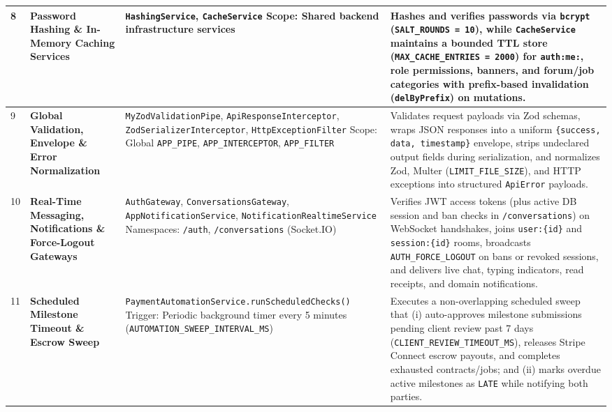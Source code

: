 \begin{longtable}{|C{0.7cm}|L{3.2cm}|S{5.4cm}|p{5.8cm}|}
8 &
\textbf{Password Hashing \& In-Memory Caching Services} &
\texttt{HashingService}, \texttt{CacheService} \newline
Scope: Shared backend infrastructure services &
Hashes and verifies passwords via \texttt{bcrypt} (\texttt{SALT\_ROUNDS = 10}), while \texttt{CacheService} maintains a bounded TTL store (\texttt{MAX\_CACHE\_\allowbreak{}ENTRIES = 2000}) for \texttt{auth:me:}, role permissions, banners, and forum/job categories with prefix-based invalidation (\texttt{delByPrefix}) on mutations.
\\ \hline

9 &
\textbf{Global Validation, Envelope \& Error Normalization} &
\texttt{MyZodValidationPipe}, \texttt{ApiResponseInterceptor}, \texttt{ZodSerializerInterceptor}, \texttt{HttpExceptionFilter} \newline
Scope: Global \texttt{APP\_PIPE}, \texttt{APP\_INTERCEPTOR}, \texttt{APP\_FILTER} &
Validates request payloads via Zod schemas, wraps JSON responses into a uniform \texttt{\{success, data, timestamp\}} envelope, strips undeclared output fields during serialization, and normalizes Zod, Multer (\texttt{LIMIT\_\allowbreak{}FILE\_\allowbreak{}SIZE}), and HTTP exceptions into structured \texttt{ApiError} payloads.
\\ \hline

10 &
\textbf{Real-Time Messaging, Notifications \& Force-Logout Gateways} &
\texttt{AuthGateway}, \texttt{ConversationsGateway}, \texttt{AppNotificationService}, \texttt{NotificationRealtimeService} \newline
Namespaces: \texttt{/auth}, \texttt{/conversations} (Socket.IO) &
Verifies JWT access tokens (plus active DB session and ban checks in \texttt{/conversations}) on WebSocket handshakes, joins \texttt{user:\{id\}} and \texttt{session:\{id\}} rooms, broadcasts \texttt{AUTH\_\allowbreak{}FORCE\_\allowbreak{}LOGOUT} on bans or revoked sessions, and delivers live chat, typing indicators, read receipts, and domain notifications.
\\ \hline

11 &
\textbf{Scheduled Milestone Timeout \& Escrow Sweep} &
\texttt{PaymentAutomationService.\allowbreak{}runScheduledChecks()} \newline
Trigger: Periodic background timer every 5 minutes (\texttt{AUTOMATION\_SWEEP\_INTERVAL\_MS}) &
Executes a non-overlapping scheduled sweep that (i) auto-approves milestone submissions pending client review past 7 days (\texttt{CLIENT\_REVIEW\_TIMEOUT\_MS}), releases Stripe Connect escrow payouts, and completes exhausted contracts/jobs; and (ii) marks overdue active milestones as \texttt{LATE} while notifying both parties.
\\ \hline


\end{longtable}
